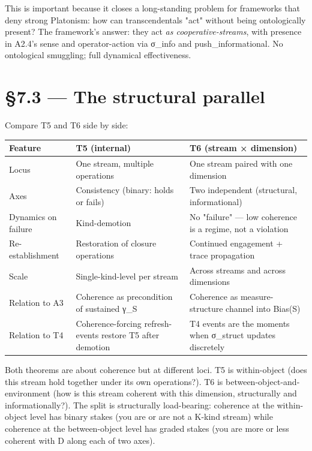 \documentclass[11pt, openany]{book}
\newcommand{\sectionbreak}{\clearpage}
\begin{document}
This is important because it closes a long-standing problem for frameworks that deny strong Platonism: how can transcendentals "act" without being ontologically present? The framework's answer: they act \textit{as cooperative-streams}, with presence in A2.4's sense and operator-action via σ\_\allowbreak{}info and push\_\allowbreak{}informational. No ontological smuggling; full dynamical effectiveness.

\sectionbreak

\section{§7.3 --- The structural parallel}

Compare T5 and T6 side by side:

\begingroup\setlength{\tabcolsep}{3pt}\renewcommand{\arraystretch}{1.15}\footnotesize
\begin{center}
\begin{tabular}{p{0.61in} p{1.86in} p{1.86in}}
\toprule
Feature & T5 (internal) & T6 (stream × dimension) \\
\midrule
Locus & One stream, multiple operations & One stream paired with one dimension \\
Axes & Consistency (binary: holds or fails) & Two independent (structural, informational) \\
Dynamics on failure & Kind-demotion & No "failure" --- low coherence is a regime, not a violation \\
Re-establishment & Restoration of closure operations & Continued engagement + trace propagation \\
Scale & Single-kind-level per stream & Across streams and across dimensions \\
Relation to A3 & Coherence as precondition of sustained γ\_\allowbreak{}S & Coherence as measure-structure channel into Bias(S) \\
Relation to T4 & Coherence-forcing refresh-events restore T5 after demotion & T4 events are the moments when σ\_\allowbreak{}struct updates discretely \\
\bottomrule
\end{tabular}
\end{center}
\endgroup
Both theorems are about coherence but at different loci. T5 is within-object (does this stream hold together under its own operations?). T6 is between-object-and-environment (how is this stream coherent with this dimension, structurally and informationally?). The split is structurally load-bearing: coherence at the within-object level has binary stakes (you are or are not a K-kind stream) while coherence at the between-object level has graded stakes (you are more or less coherent with D along each of two axes).
\end{document}
